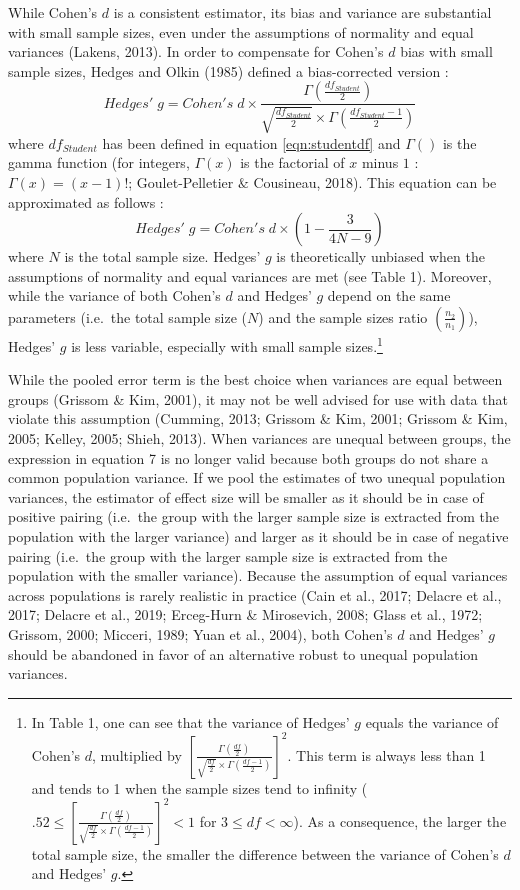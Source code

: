\documentclass[
  english,
  man,floatsintext]{apa6}
\begin{document}
While Cohen's \(d\) is a consistent estimator, its bias and variance are substantial with small sample sizes, even under the assumptions of normality and equal variances (Lakens, 2013). In order to compensate for Cohen's \(d\) bias with small sample sizes, Hedges and Olkin (1985) defined a bias-corrected version :
\begin{equation*} 
Hedges' \; g = Cohen's \; d \times \frac{\Gamma(\frac{df_{Student}}{2})}{\sqrt{\frac{df_{Student}}{2}} \times \Gamma(\frac{df_{Student}-1}{2})}
\label{eqn:Hedgesgs}
\end{equation*}
where \(df_{Student}\) has been defined in equation \ref{eqn:studentdf} and \(\Gamma()\) is the gamma function (for integers, \(\Gamma(x)\) is the factorial of \(x\) minus \(1\) : \(\Gamma(x)=(x-1)!\); Goulet-Pelletier \(\&\) Cousineau, 2018). This equation can be approximated as follows :
\begin{equation*} 
Hedges' \; g = Cohen's \; d \times \left( 1- \frac{3}{4N -9} \right)
\label{eqn:Hedgesgsapprox}
\end{equation*}
where \(N\) is the total sample size. Hedges' \(g\) is theoretically unbiased when the assumptions of normality and equal variances are met (see Table 1). Moreover, while the variance of both Cohen's \(d\) and Hedges' \(g\) depend on the same parameters (i.e.~the total sample size (\(N\)) and the sample sizes ratio \(\left(\frac{n_2}{n_1}\right)\)), Hedges' \(g\) is less variable, especially with small sample sizes.\footnote{In Table 1, one can see that the variance of Hedges' $g$ equals the variance of Cohen's $d$, multiplied by $\left[\frac{\Gamma(\frac{df}{2})}{\sqrt{\frac{df}{2}} \times \Gamma(\frac{df-1}{2})} \right] ^2$. This term is always less than 1 and tends to 1 when the sample sizes tend to infinity ($.52 \le \left[\frac{\Gamma(\frac{df}{2})}{\sqrt{\frac{df}{2}} \times \Gamma(\frac{df-1}{2})} \right] ^2 < 1$ for $3 \le df < \infty$). As a consequence, the larger the total sample size, the smaller the difference between the variance of Cohen's $d$ and Hedges' $g$.}

While the pooled error term is the best choice when variances are equal between groups (Grissom \& Kim, 2001), it may not be well advised for use with data that violate this assumption (Cumming, 2013; Grissom \& Kim, 2001; Grissom \& Kim, 2005; Kelley, 2005; Shieh, 2013). When variances are unequal between groups, the expression in equation 7 is no longer valid because both groups do not share a common population variance. If we pool the estimates of two unequal population variances, the estimator of effect size will be smaller as it should be in case of positive pairing (i.e.~the group with the larger sample size is extracted from the population with the larger variance) and larger as it should be in case of negative pairing (i.e.~the group with the larger sample size is extracted from the population with the smaller variance). Because the assumption of equal variances across populations is rarely realistic in practice (Cain et al., 2017; Delacre et al., 2017; Delacre et al., 2019; Erceg-Hurn \& Mirosevich, 2008; Glass et al., 1972; Grissom, 2000; Micceri, 1989; Yuan et al., 2004), both Cohen's \(d\) and Hedges' \(g\) should be abandoned in favor of an alternative robust to unequal population variances.
\end{document}
